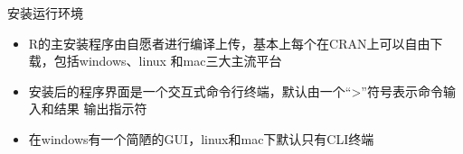 \documentclass{beamerthemeMono}
\begin{document}
\begin{frame}[t]{\subsecname}{安装运行环境}
\begin{itemize}
 \item R的主安装程序由自愿者进行编译上传，基本上每个在CRAN上可以自由下载，包括windows、linux
                 和mac三大主流平台
\item 安装后的程序界面是一个交互式命令行终端，默认由一个“>”符号表示命令输入和结果
                 输出指示符
 \item 在windows有一个简陋的GUI，linux和mac下默认只有CLI终端 
\end{itemize} 

\begin{overlayarea}{\textwidth}{\textheight}


\end{overlayarea}
\end{frame}
\end{document}
